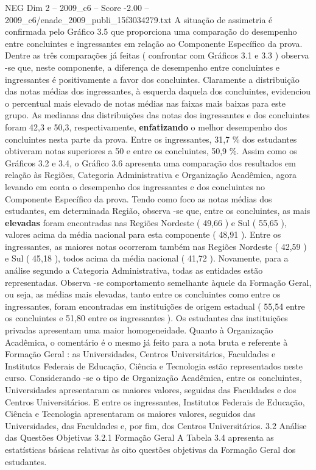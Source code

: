 \begin{textsample}{NEG Dim 2 – 2009\_c6 – Score -2.00 – 2009\_c6/enade\_2009\_publi\_15f3034279.txt}
A situação de assimetria é confirmada pelo Gráfico 3.5 que proporciona uma comparação do desempenho entre concluintes e ingressantes em relação ao Componente Específico da prova.
Dentre as três comparações já feitas ( confrontar com Gráficos 3.1 e 3.3 ) observa -se que, neste componente, a diferença de desempenho entre concluintes e ingressantes é positivamente a favor dos concluintes.
Claramente a distribuição das notas médias dos ingressantes, à esquerda daquela dos concluintes, evidenciou o percentual mais elevado de notas médias nas faixas mais baixas para este grupo.
As medianas das distribuições das notas dos ingressantes e dos concluintes foram 42,3 e 50,3, respectivamente, \textbf{enfatizando} o melhor desempenho dos concluintes nesta parte da prova.
Entre os ingressantes, 31,7 \% dos estudantes obtiveram notas superiores a 50 e entre os concluintes, 50,9 \%.
Assim como os Gráficos 3.2 e 3.4, o Gráfico 3.6 apresenta uma comparação dos resultados em relação às Regiões, Categoria Administrativa e Organização Acadêmica, agora levando em conta o desempenho dos ingressantes e dos concluintes no Componente Específico da prova.
Tendo como foco as notas médias dos estudantes, em determinada Região, observa -se que, entre os concluintes, as mais \textbf{elevadas} foram encontradas nas Regiões Nordeste ( 49,66 ) e Sul ( 55,65 ), valores acima da média nacional para esta componente ( 48,91 ).
Entre os ingressantes, as maiores notas ocorreram também nas Regiões Nordeste ( 42,59 ) e Sul ( 45,18 ), todos acima da média nacional ( 41,72 ).
Novamente, para a análise segundo a Categoria Administrativa, todas as entidades estão representadas.
Observa -se comportamento semelhante àquele da Formação Geral, ou seja, as médias mais elevadas, tanto entre os concluintes como entre os ingressantes, foram encontradas em instituições de origem estadual ( 55,54 entre os concluintes e 51,80 entre os ingressantes ).
Os estudantes das instituições privadas apresentam uma maior homogeneidade.
Quanto à Organização Acadêmica, o comentário é o mesmo já feito para a nota bruta e referente à Formação Geral : as Universidades, Centros Universitários, Faculdades e Institutos Federais de Educação, Ciência e Tecnologia estão representados neste curso.
Considerando -se o tipo de Organização Acadêmica, entre os concluintes, Universidades apresentaram os maiores valores, seguidas das Faculdades e dos Centros Universitários.
E entre os ingressantes, Institutos Federais de Educação, Ciência e Tecnologia apresentaram os maiores valores, seguidos das Universidades, das Faculdades e, por fim, dos Centros Universitários. 3.2 Análise das Questões Objetivas 3.2.1 Formação Geral A Tabela 3.4 apresenta as estatísticas básicas relativas às oito questões objetivas da Formação Geral dos estudantes.

\end{textsample}
